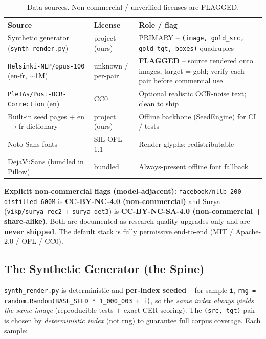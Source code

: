 \documentclass[12pt,a4paper]{article}
\begin{document}
\begin{table}[H]
\centering
\caption{Data sources. Non-commercial / unverified licenses are FLAGGED.}
\small
\begin{tabularx}{\linewidth}{@{} l l L @{}}
\toprule
\textbf{Source} & \textbf{License} & \textbf{Role / flag} \\
\midrule
Synthetic generator (\texttt{synth\_render.py}) & project (ours) & PRIMARY -- \texttt{(image, gold\_src, gold\_tgt, boxes)} quadruples \\
\texttt{Helsinki-NLP/opus-100} (en-fr, $\sim$1M) & unknown / per-pair & \textbf{FLAGGED} -- source rendered onto images, target = gold; verify each pair before commercial use \\
\texttt{PleIAs/Post-OCR-Correction} (en) & CC0 & Optional realistic OCR-noise text; clean to ship \\
Built-in seed pages + en$\rightarrow$fr dictionary & project (ours) & Offline backbone (SeedEngine) for CI / tests \\
Noto Sans fonts & SIL OFL 1.1 & Render glyphs; redistributable \\
DejaVuSans (bundled in Pillow) & bundled & Always-present offline font fallback \\
\bottomrule
\end{tabularx}
\end{table}

\textbf{Explicit non-commercial flags (model-adjacent):} \texttt{facebook/nllb-200-distilled-600M} is \textbf{CC-BY-NC-4.0 (non-commercial)} and Surya (\texttt{vikp/surya\_rec2} + \texttt{surya\_det3}) is \textbf{CC-BY-NC-SA-4.0 (non-commercial + share-alike)}. Both are documented as research-quality upgrades only and are \textbf{never shipped}. The default stack is fully permissive end-to-end (MIT / Apache-2.0 / OFL / CC0).

\subsection{The Synthetic Generator (the Spine)}

\texttt{synth\_render.py} is deterministic and \textbf{per-index seeded} -- for sample \texttt{i}, \texttt{rng = random.Random(BASE\_SEED * 1\_000\_003 + i)}, so the \emph{same index always yields the same image} (reproducible tests + exact CER scoring). The \texttt{(src, tgt)} pair is chosen by \emph{deterministic index} (not rng) to guarantee full corpus coverage. Each sample:
\end{document}
